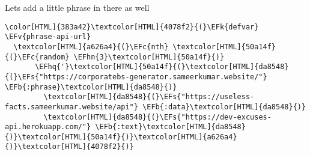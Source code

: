 \documentclass{scrartcl}
\newcommand{\EFk}[1]{\textcolor{EFk}{#1}} %
\newcommand{\EFs}[1]{\textcolor{EFs}{#1}} %
\newcommand{\EFb}[1]{\textcolor{EFb}{#1}} %
\newcommand{\EFc}[1]{\textcolor{EFc}{#1}} %
\newcommand{\EFv}[1]{\textcolor{EFv}{#1}} %
\newcommand{\EFhn}[1]{\textcolor{EFhn}{\textbf{#1}}} %
\newcommand{\EFhq}[1]{\textcolor{EFhq}{#1}} %
\begin{document}
Lets add a little phrase in there as well
\begin{Code}
\begin{Verbatim}[]
\color[HTML]{383a42}\textcolor[HTML]{4078f2}{(}\EFk{defvar} \EFv{phrase-api-url}
  \textcolor[HTML]{a626a4}{(}\EFc{nth} \textcolor[HTML]{50a14f}{(}\EFc{random} \EFhn{3}\textcolor[HTML]{50a14f}{)}
       \EFhq{'}\textcolor[HTML]{50a14f}{(}\textcolor[HTML]{da8548}{(}\EFs{"https://corporatebs-generator.sameerkumar.website/"} \EFb{:phrase}\textcolor[HTML]{da8548}{)}
         \textcolor[HTML]{da8548}{(}\EFs{"https://useless-facts.sameerkumar.website/api"} \EFb{:data}\textcolor[HTML]{da8548}{)}
         \textcolor[HTML]{da8548}{(}\EFs{"https://dev-excuses-api.herokuapp.com/"} \EFb{:text}\textcolor[HTML]{da8548}{)}\textcolor[HTML]{50a14f}{)}\textcolor[HTML]{a626a4}{)}\textcolor[HTML]{4078f2}{)}


\end{Verbatim}
\end{Code}
\end{document}
